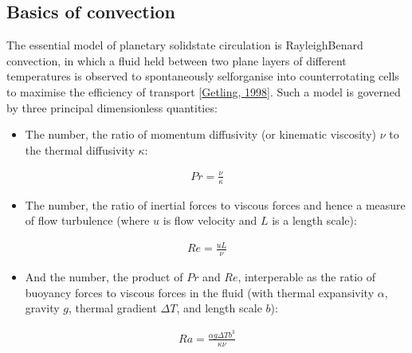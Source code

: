 \documentclass[letterpaper,10pt,english]{jupyterBook}
\begin{document}
\subsection{Basics of convection}
\label{\detokenize{content/chapter_04_isoviscous/background/basics:basics-of-convection}}\label{\detokenize{content/chapter_04_isoviscous/background/basics::doc}}
\sphinxAtStartPar
The essential model of planetary solid\sphinxhyphen{}state circulation is Rayleigh\sphinxhyphen{}Benard convection, in which a fluid held between two plane layers of different temperatures is observed to spontaneously self\sphinxhyphen{}organise into counter\sphinxhyphen{}rotating cells to maximise the efficiency of transport {[}\hyperlink{cite.references:id768}{Getling, 1998}{]}. Such a model is governed by three principal dimensionless quantities:
\begin{itemize}
\item {} 
\sphinxAtStartPar
The  number, the ratio of momentum diffusivity (or kinematic viscosity) \(\nu\) to the thermal diffusivity \(\kappa\):

\end{itemize}
\begin{equation*}
\begin{split} Pr = \frac{\nu}{\kappa} \end{split}
\end{equation*}\begin{itemize}
\item {} 
\sphinxAtStartPar
The  number, the ratio of inertial forces to viscous forces and hence a measure of flow turbulence (where \(u\) is flow velocity and \(L\) is a length scale):

\end{itemize}
\begin{equation*}
\begin{split} Re =\frac{u L}{\nu} \end{split}
\end{equation*}\begin{itemize}
\item {} 
\sphinxAtStartPar
And the  number, the product of \(Pr\) and \(Re\), interperable as the ratio of buoyancy forces to viscous forces in the fluid (with thermal expansivity \(\alpha\), gravity \(g\), thermal gradient \(\Delta T\), and length scale \(b\)):

\end{itemize}
\begin{equation*}
\begin{split} Ra = \frac{\alpha g \Delta T b^3}{\kappa \nu} \end{split}
\end{equation*}
\end{document}
